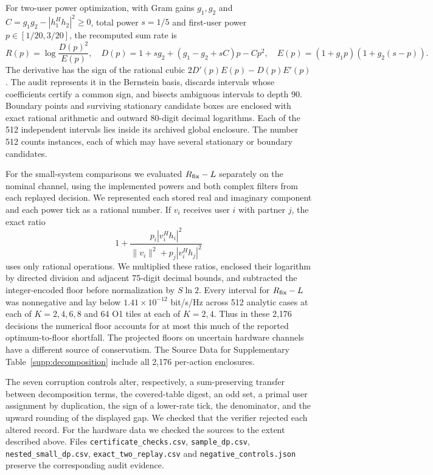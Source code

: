 For two-user power optimization, with Gram gains $g_1,g_2$ and
$C=g_1g_2-|h_1^Hh_2|^2\geq0$, total power $s=1/5$ and first-user power
$p\in[1/20,3/20]$, the recomputed sum rate is
\begin{equation}
 R(p)=\log\frac{D(p)^2}{E(p)},\quad
 D(p)=1+sg_2+(g_1-g_2+sC)p-Cp^2,\quad
 E(p)=(1+g_1p)(1+g_2(s-p)).
\end{equation}
The derivative has the sign of the rational cubic
$2D'(p)E(p)-D(p)E'(p)$. The audit represents it in the Bernstein basis,
discards intervals whose coefficients certify a common sign, and bisects
ambiguous intervals to depth 90. Boundary points and surviving stationary
candidate boxes are enclosed with exact rational arithmetic and outward
80-digit decimal logarithms. Each of the 512 independent intervals lies
inside its archived global enclosure. The number 512 counts instances,
each of which may have several stationary or boundary candidates.

For the small-system comparisons we evaluated \(R_{\rm fix}-L\) separately on the nominal channel, using the implemented powers and both complex filters from each replayed decision. We represented each stored real and imaginary component and each power tick as a rational number. If \(v_i\) receives user \(i\) with partner \(j\), the exact ratio
\[
1+\frac{p_i|v_i^Hh_i|^2}{\|v_i\|^2+p_j|v_i^Hh_j|^2}
\]
uses only rational operations. We multiplied these ratios, enclosed their logarithm by directed division and adjacent 75-digit decimal bounds, and subtracted the integer-encoded floor before normalization by \(S\ln2\). Every interval for \(R_{\rm fix}-L\) was nonnegative and lay below \(1.41\times10^{-12}\) bit/s/Hz across 512 analytic cases at each of \(K=2,4,6,8\) and 64 O1 tiles at each of \(K=2,4\). Thus in these 2,176 decisions the numerical floor accounts for at most this much of the reported optimum-to-floor shortfall. The projected floors on uncertain hardware channels have a different source of conservatism. The Source Data for Supplementary Table~\ref{supp:decomposition} include all 2,176 per-action enclosures.

The seven corruption controls alter, respectively, a sum-preserving transfer
between decomposition terms, the covered-table digest, an odd set, a primal user
assignment by duplication, the sign of a lower-rate tick, the denominator,
and the upward rounding of the displayed gap. We checked that the verifier rejected each altered record. For the hardware data we checked the sources to the extent described above. Files \texttt{certificate\_checks.csv}, \texttt{sample\_dp.csv},
\texttt{nested\_small\_dp.csv}, \texttt{exact\_two\_replay.csv} and
\texttt{negative\_controls.json} preserve the corresponding audit evidence.


